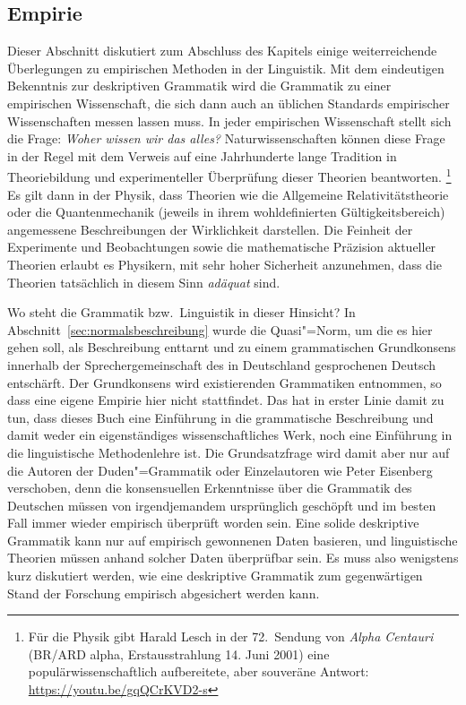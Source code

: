 \subsection{Empirie}

\label{sec:empirie}


Dieser Abschnitt diskutiert zum Abschluss des Kapitels einige weiterreichende Überlegungen zu empirischen Methoden in der Linguistik.
Mit dem eindeutigen Bekenntnis zur deskriptiven Grammatik wird die Grammatik zu einer empirischen Wissenschaft, die sich dann auch an üblichen Standards empirischer Wissenschaften messen lassen muss.     
In jeder empirischen Wissenschaft stellt sich die Frage:
\textit{Woher wissen wir das alles?}
Naturwissenschaften können diese Frage in der Regel mit dem Verweis auf eine Jahrhunderte lange Tradition in Theoriebildung und experimenteller Überprüfung dieser Theorien beantworten.%
\footnote{Für die Physik gibt Harald Lesch in der 72.\ Sendung von \textit{Alpha Centauri} (BR\slash ARD alpha, Erstausstrahlung 14. Juni 2001) eine populärwissenschaftlich aufbereitete, aber souveräne Antwort: \url{https://youtu.be/gqQCrKVD2-s}}
Es gilt dann \zB in der Physik, dass Theorien wie die Allgemeine Relativitätstheorie oder die Quantenmechanik (jeweils in ihrem wohldefinierten Gültigkeitsbereich) angemessene Beschreibungen der Wirklichkeit darstellen.
Die Feinheit der Experimente und Beobachtungen sowie die mathematische Präzision aktueller Theorien erlaubt es Physikern, mit sehr hoher Sicherheit anzunehmen, dass die Theorien tatsächlich in diesem Sinn \textit{adäquat} sind.

Wo steht die Grammatik bzw.\ Linguistik in dieser Hinsicht?
In Abschnitt~\ref{sec:normalsbeschreibung} wurde die Quasi"=Norm, um die es hier gehen soll, als Beschreibung enttarnt und zu einem grammatischen Grundkonsens innerhalb der Sprechergemeinschaft des in Deutschland gesprochenen Deutsch entschärft.
Der Grundkonsens wird existierenden Grammatiken entnommen, so dass eine eigene Empirie hier nicht stattfindet.
Das hat in erster Linie damit zu tun, dass dieses Buch eine Einführung in die grammatische Beschreibung und damit weder ein eigenständiges wissenschaftliches Werk, noch eine Einführung in die linguistische Methodenlehre ist.
Die Grundsatzfrage wird damit aber nur auf die Autoren der Duden"=Grammatik oder Einzelautoren wie Peter Eisenberg verschoben, denn die konsensuellen Erkenntnisse über die Grammatik des Deutschen müssen von irgendjemandem ursprünglich geschöpft und im besten Fall immer wieder empirisch überprüft worden sein.
Eine solide deskriptive Grammatik kann nur auf empirisch gewonnenen Daten basieren, und linguistische Theorien müssen anhand solcher Daten überprüfbar sein.
Es muss also wenigstens kurz diskutiert werden, wie eine deskriptive Grammatik zum gegenwärtigen Stand der Forschung empirisch abgesichert werden kann.

